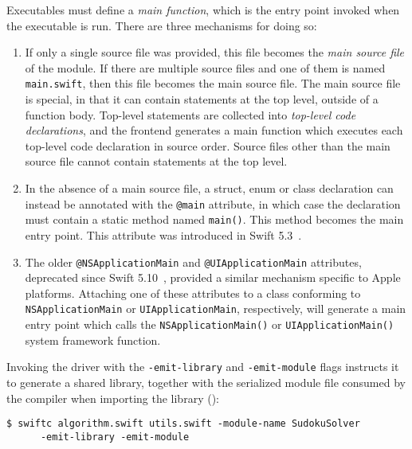 \documentclass[../generics]{subfiles}
\begin{document}
Executables must define a \emph{main function}, which is the entry point invoked when the executable is run. There are three mechanisms for doing so:
\begin{enumerate}
\item If only a single source file was provided, this file becomes the \emph{main source file} of the module. If there are multiple source files and one of them is named \texttt{main.swift}, then this file becomes the main source file. The main source file is special, in that it can contain statements at the top level, outside of a function body. Top-level statements are collected into \emph{top-level code declarations}, and the frontend generates a main function which executes each top-level code declaration in source order. Source files other than the main source file cannot contain statements at the top level.
\item In the absence of a main source file, a struct, enum or class declaration can instead be annotated with the \texttt{@main} attribute, in which case the declaration must contain a static method named \texttt{main()}. This method becomes the main entry point. This attribute was introduced in Swift 5.3~\cite{se0281}.
\item The older \texttt{@NSApplicationMain} and \texttt{@UIApplicationMain} attributes, deprecated since Swift 5.10~\cite{se0383}, provided a similar mechanism specific to Apple platforms. Attaching one of these attributes to a class conforming to \texttt{NSApplicationMain} or \texttt{UIApplicationMain}, respectively, will generate a main entry point which calls the \texttt{NSApplicationMain()} or \texttt{UIApplicationMain()} system framework function.
\end{enumerate}

Invoking the driver with the \texttt{-emit-library} and \texttt{-emit-module} flags instructs it to generate a shared library, together with the serialized module file consumed by the compiler when importing the library ():
\begin{Verbatim}
$ swiftc algorithm.swift utils.swift -module-name SudokuSolver
      -emit-library -emit-module
\end{Verbatim}
\end{document}
